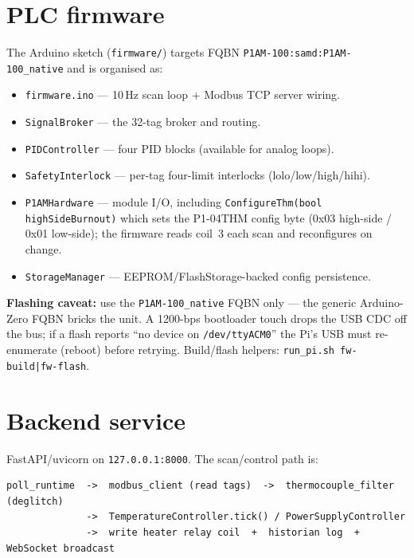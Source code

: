 \documentclass[11pt]{article}
\newcommand{\code}[1]{\texttt{#1}}
\begin{document}
\section{PLC firmware}
The Arduino sketch (\code{firmware/}) targets FQBN
\code{P1AM-100:samd:P1AM-100\_native} and is organised as:

\begin{itemize}[nosep]
  \item \code{firmware.ino} --- 10\,Hz scan loop + Modbus TCP server wiring.
  \item \code{SignalBroker} --- the 32-tag broker and routing.
  \item \code{PIDController} --- four PID blocks (available for analog loops).
  \item \code{SafetyInterlock} --- per-tag four-limit interlocks (lolo/low/high/hihi).
  \item \code{P1AMHardware} --- module I/O, including \code{ConfigureThm(bool highSideBurnout)}
        which sets the P1-04THM config byte (0x03 high-side / 0x01 low-side); the
        firmware reads coil~3 each scan and reconfigures on change.
  \item \code{StorageManager} --- EEPROM/FlashStorage-backed config persistence.
\end{itemize}

\noindent \textbf{Flashing caveat:} use the \code{P1AM-100\_native} FQBN only ---
the generic Arduino-Zero FQBN bricks the unit. A 1200-bps bootloader touch drops
the USB CDC off the bus; if a flash reports ``no device on \code{/dev/ttyACM0}''
the Pi's USB must re-enumerate (reboot) before retrying. Build/flash helpers:
\code{run\_pi.sh fw-build|fw-flash}.

\section{Backend service}
FastAPI/uvicorn on \code{127.0.0.1:8000}. The scan/control path is:

\begin{lstlisting}
poll_runtime  ->  modbus_client (read tags)  ->  thermocouple_filter (deglitch)
              ->  TemperatureController.tick() / PowerSupplyController
              ->  write heater relay coil  +  historian log  +  WebSocket broadcast
\end{lstlisting}
\end{document}

